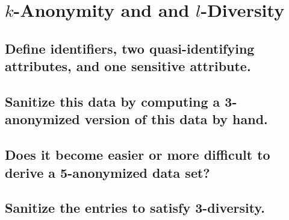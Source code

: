 \documentclass{report}
\begin{document}
	\section{$k$-Anonymity and and $l$-Diversity}
	\startsection
		\subsection{Define identifiers, two quasi-identifying attributes, and one sensitive attribute.}
		\startsubsection
		\closesection
		\subsection{Sanitize this data by computing a 3-anonymized version of this data by hand.}
		\startsubsection
		\closesection
		\subsection{Does it become easier or more difficult to derive a 5-anonymized data set?}
		\startsubsection
		\closesection
		\subsection{Sanitize the entries to satisfy 3-diversity.}
		\startsubsection
		\closesection
	\closesection
\end{document}
